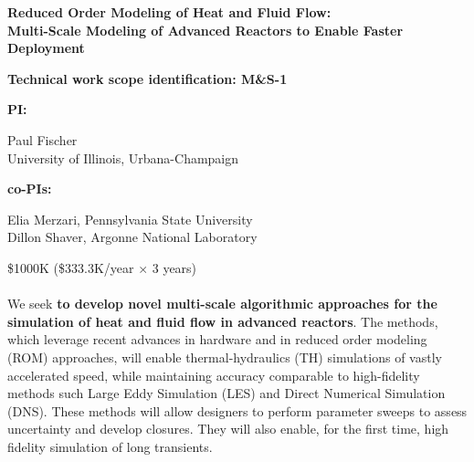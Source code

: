 \parindent 0in
\parskip 0.1in

\begin{center}
{\bf Reduced Order Modeling of Heat and Fluid Flow: \\
Multi-Scale Modeling of Advanced Reactors to Enable Faster Deployment}
\\[-7ex]
\end{center}

{\bf Technical work scope identification: M\&S-1 }

{\bf PI: }\begin{minipage}[t]{2.8in}
Paul Fischer \\
University of Illinois, Urbana-Champaign
\end{minipage}
{\bf co-PIs: } \begin{minipage}[t]{3in}
Elia Merzari, Pennsylvania State University \\
Dillon Shaver, Argonne National Laboratory \\[-2ex]
\end{minipage}

 \$1000K (\$333.3K/year $\times$ 3 years)\\[-2ex]

 \\[-4ex]


We seek \textbf{to develop novel multi-scale algorithmic approaches for the
simulation of heat and fluid flow in advanced reactors}. The methods, which
leverage recent advances in hardware and in reduced order modeling (ROM)
approaches, will enable thermal-hydraulics (TH) simulations of vastly
accelerated speed, while maintaining accuracy comparable to high-fidelity
methods such Large Eddy Simulation (LES) and Direct Numerical Simulation (DNS).
These methods will allow designers to perform parameter sweeps to assess
uncertainty and develop closures. They will also enable, for the first time,
high fidelity simulation of long transients.

